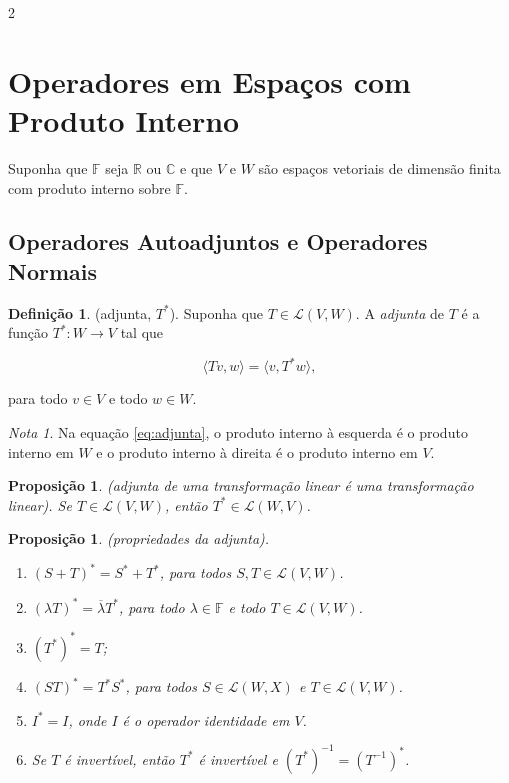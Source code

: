 \documentclass{article}
\theoremstyle{plain}
\newtheorem{prop}[thm]{Proposição}
\theoremstyle{definition}
\newtheorem{defn}{Definição}[section]
\theoremstyle{remark}
\newtheorem*{rem}{Nota}
\begin{document}
\begin{multicols}{2}
\section{Operadores em Espaços com Produto Interno}

Suponha que \(\mathbb{F}\) seja \(\mathbb{R}\) ou \(\mathbb{C}\) e que \(V\) e \(W\) são espaços vetoriais de dimensão finita com produto interno sobre \(\mathbb{F}\).

\subsection{Operadores Autoadjuntos e Operadores Normais}

\begin{defn} (adjunta, \(T^*\)).
    Suponha que \(T \in \mathcal{L}(V, W)\). A \emph{adjunta} de \(T\) é a função \(T^*: W \to V\) tal que

    \begin{equation} \label{eq:adjunta}
        \langle Tv, w \rangle = \langle v, T^* w \rangle,
    \end{equation}

    \noindent para todo \(v \in V\) e todo \(w \in W\).
\end{defn}

\begin{rem}
    Na equação \eqref{eq:adjunta}, o produto interno à esquerda é o produto interno em \(W\) e o produto interno à direita é o produto interno em \(V\).
\end{rem}

\begin{prop} (adjunta de uma transformação linear é uma transformação linear).
    Se \(T \in \mathcal{L}(V, W)\), então \(T^* \in \mathcal{L}(W, V)\).
\end{prop}

\begin{prop} (propriedades da adjunta).
    \begin{enumerate}
        \item [\textup{(a)}] \((S + T)^* = S^* + T^*\), para todos \(S, T \in \mathcal{L}(V, W)\).
        \item [\textup{(b)}] \((\lambda T)^* = \overline{\lambda} T^*\), para todo \(\lambda \in \mathbb{F}\) e todo \(T \in \mathcal{L}(V, W)\).
        \item [\textup{(c)}] \((T^*)^* = T\);
        \item [\textup{(d)}] \((ST)^* = T^* S^*\), para todos \(S \in \mathcal{L}(W, X)\) e \(T \in \mathcal{L}(V, W)\).
        \item [\textup{(e)}] \(I^* = I\), onde \(I\) é o operador identidade em \(V\).
        \item [\textup{(f)}] Se \(T\) é invertível, então \(T^*\) é invertível e \((T^*)^{-1} = (T^{-1})^*\).
    \end{enumerate}
\end{prop}


\end{multicols}
\end{document}
